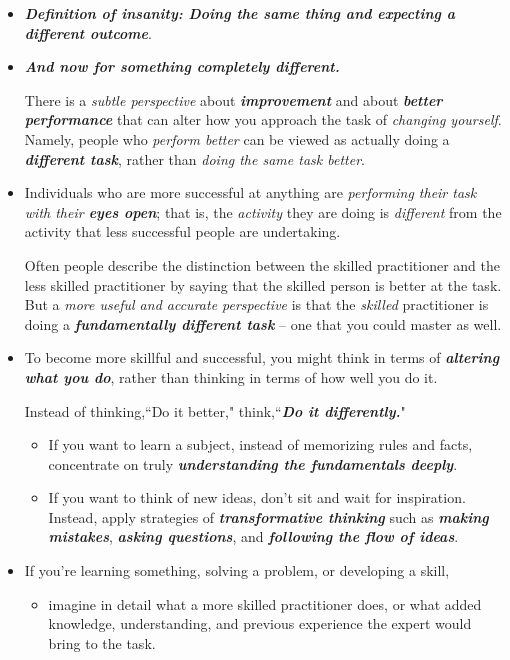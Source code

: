 \documentclass[11pt]{article}
\begin{document}
\begin{itemize}
\item \emph{\textbf{Definition of insanity: Doing the same thing and expecting a different outcome}}.

\item \emph{\textbf{And now for something completely different.}} 

There is a \emph{subtle perspective} about \emph{\textbf{improvement}} and about \emph{\textbf{better performance}} that can alter how you approach the task of \emph{changing yourself}. Namely, people who \emph{perform better} can be viewed as actually doing a \emph{\textbf{different task}}, rather than \emph{doing the same task better}.

\item Individuals who are more successful at anything are \emph{performing their task with their \textbf{eyes open}}; that is, the \emph{activity} they are doing is \emph{different} from the activity that less successful people are undertaking. 

Often people describe the distinction between the skilled practitioner and the less skilled practitioner by saying that the skilled person is better at the task. But a \emph{more useful and accurate perspective} is that the \emph{skilled} practitioner is doing a \emph{\textbf{fundamentally different task}} -- one that you could master as well.

\item To become more skillful and successful, you might think in terms of \emph{\textbf{altering what you do}}, rather than thinking in terms of how well you do it. 

Instead of thinking,``Do it better," think,``\emph{\textbf{Do it differently.}}" 
\begin{itemize}
\item If you want to learn a subject, instead of memorizing rules and facts, concentrate on truly \emph{\textbf{understanding the fundamentals deeply}}.

\item If you want to think of new ideas, don’t sit and wait for inspiration. Instead, apply strategies of \emph{\textbf{transformative thinking}} such as \emph{\textbf{making mistakes}}, \emph{\textbf{asking questions}}, and \emph{\textbf{following the flow of ideas}}.
\end{itemize}

\item \begin{exercise}
If you’re learning something, solving a problem, or developing a skill, 
\begin{itemize}
\item imagine in detail what a more skilled practitioner does, or what added knowledge, understanding, and previous experience the expert would bring to the task. 


\end{itemize}
\end{exercise}
\end{itemize}
\end{document}
